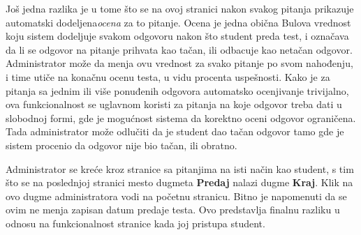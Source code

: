 Još jedna razlika je u tome što se na ovoj stranici nakon svakog pitanja prikazuje automatski dodeljena\emph{ocena} za to pitanje. Ocena je jedna obična Bulova vrednost koju sistem dodeljuje svakom odgovoru nakon što student preda test, i označava da li se odgovor na pitanje prihvata kao tačan, ili odbacuje kao netačan odgovor. Administrator može da menja ovu vrednost za svako pitanje po svom nahođenju, i time utiče na konačnu ocenu testa, u vidu procenta uspešnosti. Kako je za pitanja sa jednim ili više ponuđenih odgovora automatsko ocenjivanje trivijalno, ova funkcionalnost se uglavnom koristi za pitanja na koje odgovor treba dati u slobodnoj formi, gde je mogućnost sistema da korektno oceni odgovor ograničena. Tada administrator može odlučiti da je student dao tačan odgovor tamo gde je sistem procenio da odgovor nije bio tačan, ili obratno.

Administrator se kreće kroz stranice sa pitanjima na isti način kao student, s tim što se na poslednjoj stranici mesto dugmeta \textbf{Predaj} nalazi dugme \textbf{Kraj}. Klik na ovo dugme administratora vodi na početnu stranicu. Bitno je napomenuti da se ovim ne menja zapisan datum predaje testa. Ovo predstavlja finalnu razliku u odnosu na funkcionalnost stranice kada joj pristupa student.

